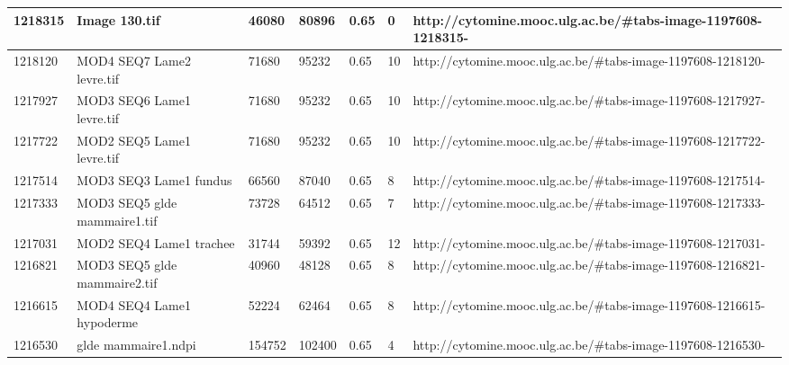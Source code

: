 \documentclass[a4paper,11pt]{report}
\numberwithin{figure}{section} %
\begin{document}
\begin{table}[]
{\begin{tabular}{|l|l|l|l|l|l|l|}
1218315  & Image 130.tif                                                                                & 46080  & 80896  & 0.65                  & 0           & http://cytomine.mooc.ulg.ac.be/\#tabs-image-1197608-1218315-  \\ \hline
1218120  & MOD4 SEQ7 Lame2 levre.tif                                                                    & 71680  & 95232  & 0.65                  & 10          & http://cytomine.mooc.ulg.ac.be/\#tabs-image-1197608-1218120-  \\ \hline
1217927  & MOD3 SEQ6 Lame1 levre.tif                                                                    & 71680  & 95232  & 0.65                  & 10          & http://cytomine.mooc.ulg.ac.be/\#tabs-image-1197608-1217927-  \\ \hline
1217722  & MOD2 SEQ5 Lame1 levre.tif                                                                    & 71680  & 95232  & 0.65                  & 10          & http://cytomine.mooc.ulg.ac.be/\#tabs-image-1197608-1217722-  \\ \hline
1217514  & MOD3 SEQ3 Lame1 fundus                                                                       & 66560  & 87040  & 0.65                  & 8           & http://cytomine.mooc.ulg.ac.be/\#tabs-image-1197608-1217514-  \\ \hline
1217333  & MOD3 SEQ5 glde mammaire1.tif                                                                 & 73728  & 64512  & 0.65                  & 7           & http://cytomine.mooc.ulg.ac.be/\#tabs-image-1197608-1217333-  \\ \hline
1217031  & MOD2 SEQ4 Lame1 trachee                                                                      & 31744  & 59392  & 0.65                  & 12          & http://cytomine.mooc.ulg.ac.be/\#tabs-image-1197608-1217031-  \\ \hline
1216821  & MOD3 SEQ5 glde mammaire2.tif                                                                 & 40960  & 48128  & 0.65                  & 8           & http://cytomine.mooc.ulg.ac.be/\#tabs-image-1197608-1216821-  \\ \hline
1216615  & MOD4 SEQ4 Lame1 hypoderme                                                                    & 52224  & 62464  & 0.65                  & 8           & http://cytomine.mooc.ulg.ac.be/\#tabs-image-1197608-1216615-  \\ \hline
1216530  & glde mammaire1.ndpi                                                                          & 154752 & 102400 & 0.65                  & 4           & http://cytomine.mooc.ulg.ac.be/\#tabs-image-1197608-1216530-  \\ \hline

\end{tabular}}
\end{table}
\end{document}
